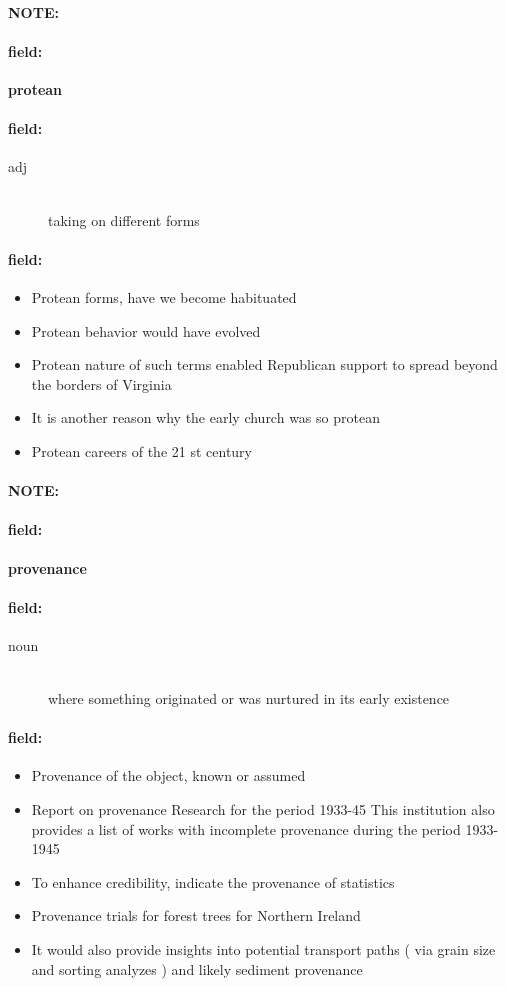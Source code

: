 \documentclass[12pt]{article}
\newenvironment{note}{\paragraph{NOTE:}}{}
\newenvironment{field}{\paragraph{field:}}{}
\begin{document}
\begin{note}
\begin{field}
\textbf{\large protean}
\end{field}


\begin{field}
\begin{description}
\item[adj] \hfill \\ 
taking on different forms

\end{description}
\end{field}

\begin{field}
\begin{itemize}
\item Protean forms, have we become habituated
\item Protean behavior would have evolved
\item Protean nature of such terms enabled Republican support to spread beyond the borders of Virginia
\item It is another reason why the early church was so protean
\item Protean careers of the 21 st century
\end{itemize}
\end{field}
\end{note}
\begin{note}
\begin{field}
\textbf{\large provenance}
\end{field}


\begin{field}
\begin{description}
\item[noun] \hfill \\ 
where something originated or was nurtured in its early existence

\end{description}
\end{field}

\begin{field}
\begin{itemize}
\item Provenance of the object, known or assumed
\item Report on provenance Research for the period 1933-45 This institution also provides a list of works with incomplete provenance during the period 1933-1945
\item To enhance credibility, indicate the provenance of statistics
\item Provenance trials for forest trees for Northern Ireland
\item It would also provide insights into potential transport paths ( via grain size and sorting analyzes ) and likely sediment provenance
\end{itemize}
\end{field}
\end{note}
\end{document}

